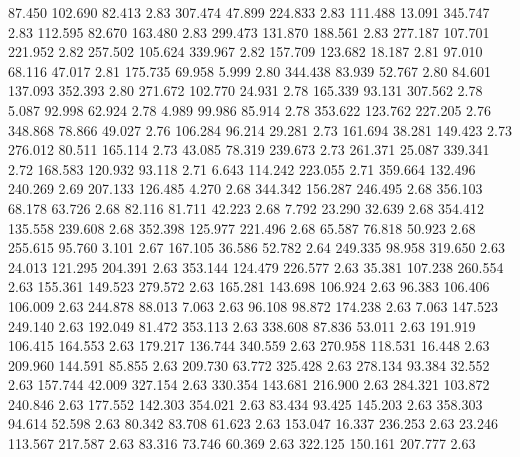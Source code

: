   87.450  102.690   82.413         2.83
 307.474   47.899  224.833         2.83
 111.488   13.091  345.747         2.83
 112.595   82.670  163.480         2.83
 299.473  131.870  188.561         2.83
 277.187  107.701  221.952         2.82
 257.502  105.624  339.967         2.82
 157.709  123.682   18.187         2.81
  97.010   68.116   47.017         2.81
 175.735   69.958    5.999         2.80
 344.438   83.939   52.767         2.80
  84.601  137.093  352.393         2.80
 271.672  102.770   24.931         2.78
 165.339   93.131  307.562         2.78
   5.087   92.998   62.924         2.78
   4.989   99.986   85.914         2.78
 353.622  123.762  227.205         2.76
 348.868   78.866   49.027         2.76
 106.284   96.214   29.281         2.73
 161.694   38.281  149.423         2.73
 276.012   80.511  165.114         2.73
  43.085   78.319  239.673         2.73
 261.371   25.087  339.341         2.72
 168.583  120.932   93.118         2.71
   6.643  114.242  223.055         2.71
 359.664  132.496  240.269         2.69
 207.133  126.485    4.270         2.68
 344.342  156.287  246.495         2.68
 356.103   68.178   63.726         2.68
  82.116   81.711   42.223         2.68
   7.792   23.290   32.639         2.68
 354.412  135.558  239.608         2.68
 352.398  125.977  221.496         2.68
  65.587   76.818   50.923         2.68
 255.615   95.760    3.101         2.67
 167.105   36.586   52.782         2.64
 249.335   98.958  319.650         2.63
  24.013  121.295  204.391         2.63
 353.144  124.479  226.577         2.63
  35.381  107.238  260.554         2.63
 155.361  149.523  279.572         2.63
 165.281  143.698  106.924         2.63
  96.383  106.406  106.009         2.63
 244.878   88.013    7.063         2.63
  96.108   98.872  174.238         2.63
   7.063  147.523  249.140         2.63
 192.049   81.472  353.113         2.63
 338.608   87.836   53.011         2.63
 191.919  106.415  164.553         2.63
 179.217  136.744  340.559         2.63
 270.958  118.531   16.448         2.63
 209.960  144.591   85.855         2.63
 209.730   63.772  325.428         2.63
 278.134   93.384   32.552         2.63
 157.744   42.009  327.154         2.63
 330.354  143.681  216.900         2.63
 284.321  103.872  240.846         2.63
 177.552  142.303  354.021         2.63
  83.434   93.425  145.203         2.63
 358.303   94.614   52.598         2.63
  80.342   83.708   61.623         2.63
 153.047   16.337  236.253         2.63
  23.246  113.567  217.587         2.63
  83.316   73.746   60.369         2.63
 322.125  150.161  207.777         2.63
